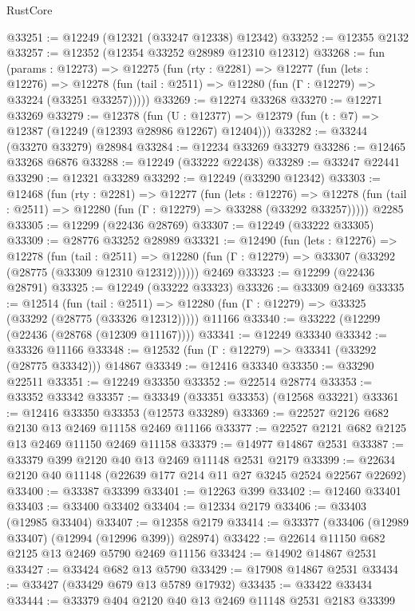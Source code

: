 \begin{lexlean}{RustCore}
\begin{coremodule}
@33251 := @12249 (@12321 (@33247 @12338) @12342)
@33252 := @12355 @2132
@33257 := @12352 (@12354 @33252 @28989 @12310 @12312)
@33268 := fun (params : @12273) =>
  @12275
    (fun (rty : @2281) =>
    @12277
      (fun (lets : @12276) =>
      @12278 (fun (tail : @2511) => @12280 (fun (Γ : @12279) => @33224 (@33251 @33257)))))
@33269 := @12274 @33268
@33270 := @12271 @33269
@33279 := @12378
    (fun (U : @12377) => @12379 (fun (t : @7) => @12387 (@12249 (@12393 @28986 @12267) @12404)))
@33282 := @33244 (@33270 @33279) @28984
@33284 := @12234 @33269 @33279
@33286 := @12465 @33268 @6876
@33288 := @12249 (@33222 @22438)
@33289 := @33247 @22441
@33290 := @12321 @33289
@33292 := @12249 (@33290 @12342)
@33303 := @12468
    (fun (rty : @2281) =>
    @12277
      (fun (lets : @12276) =>
      @12278 (fun (tail : @2511) => @12280 (fun (Γ : @12279) => @33288 (@33292 @33257)))))
    @2285
@33305 := @12299 (@22436 @28769)
@33307 := @12249 (@33222 @33305)
@33309 := @28776 @33252 @28989
@33321 := @12490
    (fun (lets : @12276) =>
    @12278
      (fun (tail : @2511) =>
      @12280 (fun (Γ : @12279) => @33307 (@33292 (@28775 (@33309 @12310 @12312))))))
    @2469
@33323 := @12299 (@22436 @28791)
@33325 := @12249 (@33222 @33323)
@33326 := @33309 @2469
@33335 := @12514
    (fun (tail : @2511) => @12280 (fun (Γ : @12279) => @33325 (@33292 (@28775 (@33326 @12312)))))
    @11166
@33340 := @33222 (@12299 (@22436 (@28768 (@12309 @11167))))
@33341 := @12249 @33340
@33342 := @33326 @11166
@33348 := @12532 (fun (Γ : @12279) => @33341 (@33292 (@28775 @33342))) @14867
@33349 := @12416 @33340
@33350 := @33290 @22511
@33351 := @12249 @33350
@33352 := @22514 @28774
@33353 := @33352 @33342
@33357 := @33349 (@33351 @33353) (@12568 @33221)
@33361 := @12416 @33350 @33353 (@12573 @33289)
@33369 := @22527 @2126 @682 @2130 @13 @2469 @11158 @2469 @11166
@33377 := @22527 @2121 @682 @2125 @13 @2469 @11150 @2469 @11158
@33379 := @14977 @14867 @2531
@33387 := @33379 @399 @2120 @40 @13 @2469 @11148 @2531 @2179
@33399 := @22634 @2120 @40 @11148 (@22639 @177 @214 @11 @27 @3245 @2524 @22567 @22692)
@33400 := @33387 @33399
@33401 := @12263 @399
@33402 := @12460 @33401
@33403 := @33400 @33402
@33404 := @12334 @2179
@33406 := @33403 (@12985 @33404)
@33407 := @12358 @2179
@33414 := @33377 (@33406 (@12989 @33407) (@12994 (@12996 @399)) @28974)
@33422 := @22614 @11150 @682 @2125 @13 @2469 @5790 @2469 @11156
@33424 := @14902 @14867 @2531
@33427 := @33424 @682 @13 @5790
@33429 := @17908 @14867 @2531
@33434 := @33427 (@33429 @679 @13 @5789 @17932)
@33435 := @33422 @33434
@33444 := @33379 @404 @2120 @40 @13 @2469 @11148 @2531 @2183 @33399

\end{coremodule}
\end{lexlean}
